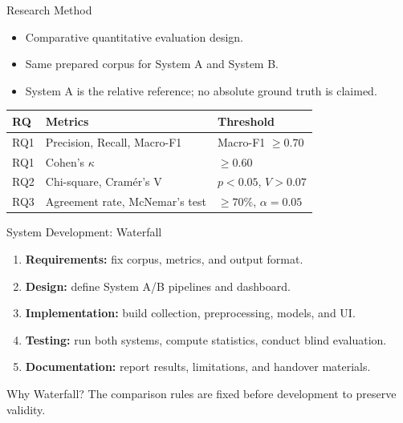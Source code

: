 \documentclass[aspectratio=169,10pt]{beamer}
\begin{document}
	
	\begin{frame}{Research Method}
		
		\begin{itemize}
			\item Comparative quantitative evaluation design.
			\item Same prepared corpus for System A and System B.
			\item System A is the relative reference; no absolute ground truth is claimed.
		\end{itemize}
		
		\vspace{-1mm}
		
		\begin{table}
			\centering
			\small
			\begin{tabular}{@{}lll@{}}
				\toprule
				RQ & Metrics & Threshold \\
				\midrule
				RQ1 & Precision, Recall, Macro-F1 & Macro-F1 $\geq 0.70$ \\
				RQ1 & Cohen's $\kappa$ & $\geq 0.60$ \\
				RQ2 & Chi-square, Cram\'er's V & $p < 0.05$, $V > 0.07$ \\
				RQ3 & Agreement rate, McNemar's test & $\geq 70\%$, $\alpha = 0.05$ \\
				\bottomrule
			\end{tabular}
		\end{table}
		
	\end{frame}
	
	
	\begin{frame}{System Development: Waterfall}
		
		\begin{enumerate}
			\item \textbf{Requirements:} fix corpus, metrics, and output format.
			\item \textbf{Design:} define System A/B pipelines and dashboard.
			\item \textbf{Implementation:} build collection, preprocessing, models, and UI.
			\item \textbf{Testing:} run both systems, compute statistics, conduct blind evaluation.
			\item \textbf{Documentation:} report results, limitations, and handover materials.
		\end{enumerate}
		
		\vspace{1mm}
		
		\begin{block}{Why Waterfall?}
			The comparison rules are fixed before development to preserve validity.
		\end{block}
		
	\end{frame}
	
\end{document}
